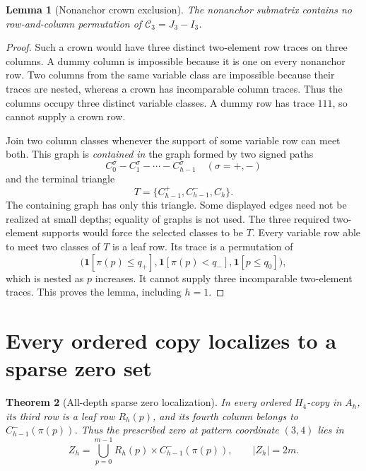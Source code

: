 \documentclass[11pt,a4paper]{article}
\newtheorem{theorem}{Theorem}[section]
\newtheorem{lemma}[theorem]{Lemma}
\theoremstyle{remark}
\newcommand{\one}{\mathbf{1}}
\newcommand{\crown}{\mathcal C}
\newcommand{\Hfour}{H_4}
\begin{document}
\begin{lemma}[Nonanchor crown exclusion]\label{lem:crown}
The nonanchor submatrix contains no row-and-column permutation of
\(\crown_3=J_3-I_3\).
\end{lemma}
\begin{proof}
Such a crown would have three distinct two-element row traces on three
columns. A dummy column is impossible because it is one on every
nonanchor row. Two columns from the same variable class are impossible
because their traces are nested, whereas a crown has incomparable
column traces. Thus the columns occupy three distinct variable classes.
A dummy row has trace \(111\), so cannot supply a crown row.

Join two column classes whenever the support of some variable row can
meet both. This graph is \emph{contained in} the graph formed by two
signed paths
\[
C_0^\sigma-C_1^\sigma-\cdots-C_{h-1}^\sigma
\quad(\sigma=+,-)
\]
and the terminal triangle
\[
T=\{C_{h-1}^+,C_{h-1}^-,C_h\}.
\]
The containing graph has only this triangle. Some displayed edges
need not be realized at small depths; equality of graphs is not used.
The three required two-element supports would force the selected
classes to be \(T\). Every variable row able to meet two classes of
\(T\) is a leaf row. Its trace is a permutation of
\[
\bigl(\one[\pi(p)\le q_+],\one[\pi(p)<q_-],\one[p\le q_0]\bigr),
\]
which is nested as \(p\) increases. It cannot supply three incomparable
two-element traces. This proves the lemma, including \(h=1\).
\end{proof}

\section{Every ordered copy localizes to a sparse zero set}
\label{sec:localization}

\begin{theorem}[All-depth sparse zero localization]\label{thm:localization}
In every ordered \(\Hfour\)-copy in \(A_h\), its third row is a leaf
row \(R_h(p)\), and its fourth column belongs to
\(C_{h-1}^-(\pi(p))\). Thus the prescribed zero at pattern coordinate
\((3,4)\) lies in
\[
Z_h=\bigcup_{p=0}^{m-1}R_h(p)\times C_{h-1}^-(\pi(p)),
\qquad |Z_h|=2m.
\]
\end{theorem}
\end{document}
